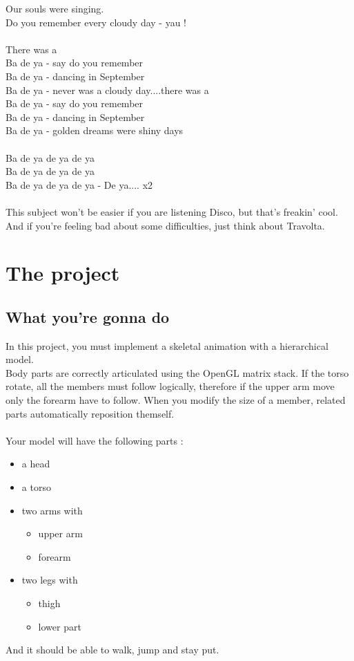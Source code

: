 \documentclass{42}
\begin{document}
{Our souls were singing.\\
Do you remember every cloudy day - yau !\\
\\
There was a\\
Ba de ya - say do you remember\\
Ba de ya - dancing in September\\
Ba de ya - never was a cloudy day....there was a\\
Ba de ya - say do you remember\\
Ba de ya - dancing in September\\
Ba de ya - golden dreams were shiny days\\
\\
Ba de ya de ya de ya\\
Ba de ya de ya de ya\\
Ba de ya de ya de ya - De ya.... {x2}\\
\\
This subject won't be easier if you are listening Disco, but that's freakin' cool.\\
And if you're feeling bad about some difficulties, just think about Travolta.

}

\chapter{The project}
\section{What you're gonna do}

In this project, you must implement a skeletal animation with a hierarchical model.\\
Body parts are correctly articulated using the OpenGL matrix stack. If the torso rotate, all the members must follow logically, therefore if the upper arm move only the forearm have to follow. When you modify the size of a member, related parts automatically reposition themself.\\
\\
Your model will have the following parts :\\
\begin{itemize}
	\item a head
	\item a torso
	\item two arms with
	\begin{itemize}
		\item upper arm
		\item forearm
	\end{itemize}
	\item two legs with
	\begin{itemize}
		\item thigh
		\item lower part\\
	\end{itemize}
\end{itemize}
{
\noindent
And it should be able to walk, jump and stay put.
}
\newpage
\end{document}
